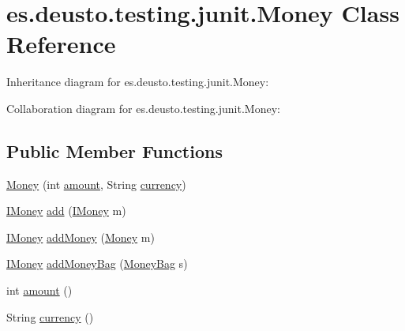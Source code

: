 \hypertarget{classes_1_1deusto_1_1testing_1_1junit_1_1_money}{}\section{es.\+deusto.\+testing.\+junit.\+Money Class Reference}
\label{classes_1_1deusto_1_1testing_1_1junit_1_1_money}


Inheritance diagram for es.\+deusto.\+testing.\+junit.\+Money\+:


Collaboration diagram for es.\+deusto.\+testing.\+junit.\+Money\+:
\subsection*{Public Member Functions}
\begin{DoxyCompactItemize}
\item 
\mbox{\hyperlink{classes_1_1deusto_1_1testing_1_1junit_1_1_money_a6f1749eb364c59ed038f79cf8965e3bc}{Money}} (int \mbox{\hyperlink{classes_1_1deusto_1_1testing_1_1junit_1_1_money_a9bef5d9027f270e8ce0303e4f929bbd5}{amount}}, String \mbox{\hyperlink{classes_1_1deusto_1_1testing_1_1junit_1_1_money_aefa4aaf62bb653eae25851d98ae02dcb}{currency}})
\item 
\mbox{\hyperlink{interfacees_1_1deusto_1_1testing_1_1junit_1_1_i_money}{I\+Money}} \mbox{\hyperlink{classes_1_1deusto_1_1testing_1_1junit_1_1_money_a6a3d64861c49dee89ffd0ed0c576045d}{add}} (\mbox{\hyperlink{interfacees_1_1deusto_1_1testing_1_1junit_1_1_i_money}{I\+Money}} m)
\item 
\mbox{\hyperlink{interfacees_1_1deusto_1_1testing_1_1junit_1_1_i_money}{I\+Money}} \mbox{\hyperlink{classes_1_1deusto_1_1testing_1_1junit_1_1_money_a223a447d5daf23b5e9cc0f551b72e328}{add\+Money}} (\mbox{\hyperlink{classes_1_1deusto_1_1testing_1_1junit_1_1_money}{Money}} m)
\item 
\mbox{\hyperlink{interfacees_1_1deusto_1_1testing_1_1junit_1_1_i_money}{I\+Money}} \mbox{\hyperlink{classes_1_1deusto_1_1testing_1_1junit_1_1_money_ad9a107a6884026a1bb12102d3a8a5b41}{add\+Money\+Bag}} (\mbox{\hyperlink{classes_1_1deusto_1_1testing_1_1junit_1_1_money_bag}{Money\+Bag}} s)
\item 
int \mbox{\hyperlink{classes_1_1deusto_1_1testing_1_1junit_1_1_money_a9bef5d9027f270e8ce0303e4f929bbd5}{amount}} ()
\item 
String \mbox{\hyperlink{classes_1_1deusto_1_1testing_1_1junit_1_1_money_aefa4aaf62bb653eae25851d98ae02dcb}{currency}} ()

\end{DoxyCompactItemize}
